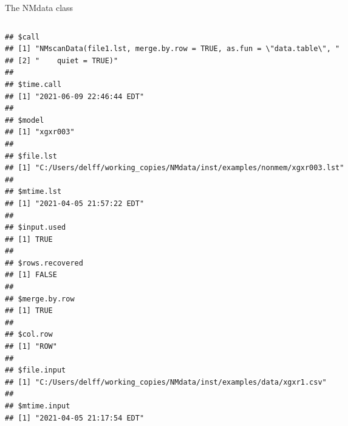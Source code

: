 \documentclass[
  8pt,
  ignorenonframetext,
  aspectratio=169]{beamer}
\begin{document}
\begin{frame}[fragile]{The NMdata class}
\begin{columns}[T]
\begin{column}{0.48\textwidth}
\begin{verbatim}
## $call
## [1] "NMscanData(file1.lst, merge.by.row = TRUE, as.fun = \"data.table\", "
## [2] "    quiet = TRUE)"                                                   
## 
## $time.call
## [1] "2021-06-09 22:46:44 EDT"
## 
## $model
## [1] "xgxr003"
## 
## $file.lst
## [1] "C:/Users/delff/working_copies/NMdata/inst/examples/nonmem/xgxr003.lst"
## 
## $mtime.lst
## [1] "2021-04-05 21:57:22 EDT"
## 
## $input.used
## [1] TRUE
## 
## $rows.recovered
## [1] FALSE
## 
## $merge.by.row
## [1] TRUE
## 
## $col.row
## [1] "ROW"
## 
## $file.input
## [1] "C:/Users/delff/working_copies/NMdata/inst/examples/data/xgxr1.csv"
## 
## $mtime.input
## [1] "2021-04-05 21:17:54 EDT"
\end{verbatim}
\end{column}
\end{columns}
\end{frame}
\end{document}
